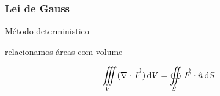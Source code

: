 \begin{frame}
  \frametitle{Lei de Gauss}

Método deterministico

\begin{alertblock}{ relacionamos áreas com volume }

\begin{align*}
  \iiint\limits_V (\nabla \cdot \overrightarrow{F}) \mathop{}\!\mathrm{d} V
  &= \oiint\limits_{S} \overrightarrow{F} \cdot \hat{n} \mathop{}\!\mathrm{d} S\\
\end{align*}


\end{alertblock}

\end{frame}
